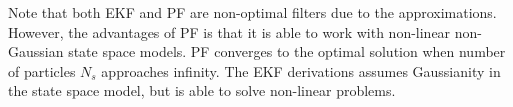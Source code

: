 \documentclass{article}
\begin{document}
Note that both EKF and PF are non-optimal filters due to the approximations. However, the advantages of PF is that it is able to work with non-linear non-Gaussian state space models. PF converges to the optimal solution when number of particles $N_s$ approaches infinity. The EKF derivations assumes Gaussianity in the state space model, but is able to solve non-linear problems.


\printbibliography
\end{document}
